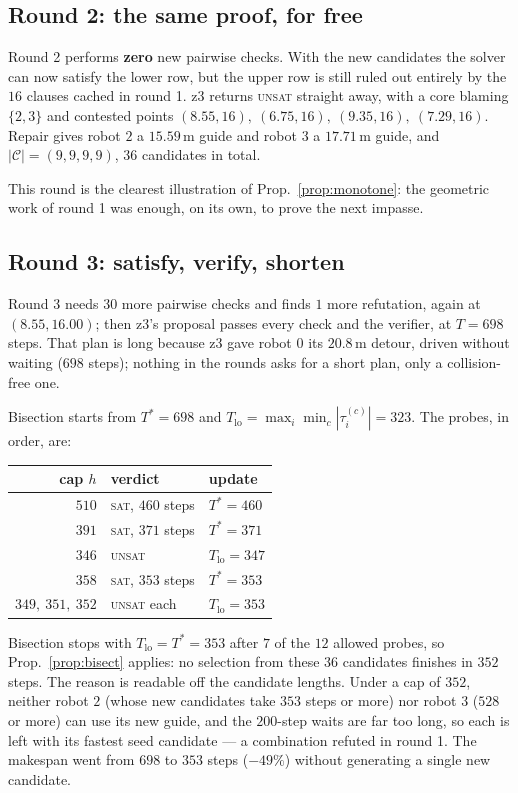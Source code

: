 \documentclass[conference]{IEEEtran}
\theoremstyle{plain}
\theoremstyle{definition}
\newcommand{\Cand}{\mathcal{C}}
\begin{document}
\subsection{Round 2: the same proof, for free}

Round 2 performs \textbf{zero} new pairwise checks. With the new candidates the solver can now
satisfy the lower row, but the upper row is still ruled out entirely by the $16$ clauses cached
in round 1. z3 returns \textsc{unsat} straight away, with a core blaming $\{2,3\}$ and contested
points $(8.55,16),\ (6.75,16),\ (9.35,16),\ (7.29,16)$. Repair gives robot $2$ a $15.59$\,m guide
and robot $3$ a $17.71$\,m guide, and $|\Cand| = (9,9,9,9)$, $36$ candidates in total.

This round is the clearest illustration of Prop.~\ref{prop:monotone}: the geometric work of
round 1 was enough, on its own, to prove the next impasse.

\subsection{Round 3: satisfy, verify, shorten}

Round 3 needs $30$ more pairwise checks and finds $1$ more refutation, again at
$(8.55, 16.00)$; then z3's proposal passes every check and the verifier, at $T = 698$ steps.
That plan is long because z3 gave robot $0$ its $20.8$\,m detour, driven without waiting
($698$ steps); nothing in the rounds asks for a short plan, only a collision-free one.

Bisection starts from $T^\ast = 698$ and $T_{\text{lo}} = \max_i \min_c |\tau_i^{(c)}| = 323$.
The probes, in order, are:
\begin{center}
\small
\begin{tabular}{rll}
\toprule
cap $h$ & verdict & update \\
\midrule
$510$ & \textsc{sat}, $460$ steps & $T^\ast = 460$ \\
$391$ & \textsc{sat}, $371$ steps & $T^\ast = 371$ \\
$346$ & \textsc{unsat} & $T_{\text{lo}} = 347$ \\
$358$ & \textsc{sat}, $353$ steps & $T^\ast = 353$ \\
$349,\ 351,\ 352$ & \textsc{unsat} each & $T_{\text{lo}} = 353$ \\
\bottomrule
\end{tabular}
\end{center}
Bisection stops with $T_{\text{lo}} = T^\ast = 353$ after $7$ of the $12$ allowed probes, so
Prop.~\ref{prop:bisect} applies: no selection from these $36$ candidates finishes in $352$
steps. The reason is readable off the candidate lengths. Under a cap of $352$, neither robot $2$
(whose new candidates take $353$ steps or more) nor robot $3$ ($528$ or more) can use its new
guide, and the $200$-step waits are far too long, so each is left with its fastest seed
candidate --- a combination refuted in round 1. The makespan went from $698$ to $353$ steps ($-49\%$) without generating a single new
candidate.
\end{document}
